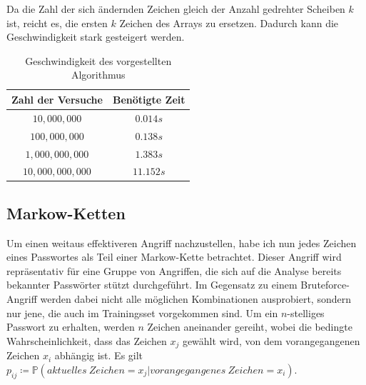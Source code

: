 \documentclass[12pt,a4paper]{scrartcl}
\numberwithin{equation}{section}
\numberwithin{myalgctr}{section}
\numberwithin{mytheoremctr}{section}
\begin{document}
\noindent
 Da die Zahl der sich ändernden Zeichen gleich der Anzahl gedrehter Scheiben $k$ ist, reicht es, die ersten $k$ Zeichen des Arrays zu ersetzen. Dadurch kann die Geschwindigkeit stark gesteigert werden.
\begin{table}[h!]
	\centering
	\begin{tabular}{|c|c|}
		\hline
		\rowcolor[HTML]{C0C0C0} 
		Zahl der Versuche & Benötigte Zeit \\ \hline
		\rowcolor[HTML]{EFEFEF} 
		$10,000,000$      & $0.014s$                   \\ \hline
		\rowcolor[HTML]{EFEFEF} 
		$100,000,000$     & $0.138s$                   \\ \hline
		\rowcolor[HTML]{EFEFEF} 
		$1,000,000,000$   & $1.383s$                   \\ \hline
		\rowcolor[HTML]{EFEFEF} 
		$10,000,000,000$  & $11.152s$                  \\ \hline
	\end{tabular}
	\caption{Geschwindigkeit des vorgestellten Algorithmus}
	\label{bruteforceTime}
\end{table}

	\newpage
	\subsection{Markow-Ketten}\label{markov-ketten}
	Um einen weitaus effektiveren Angriff nachzustellen, habe ich nun jedes Zeichen eines Passwortes als Teil einer Markow-Kette betrachtet. Dieser Angriff wird repräsentativ für eine Gruppe von Angriffen, die sich auf die Analyse bereits bekannter Passwörter stützt durchgeführt. Im Gegensatz zu einem Bruteforce-Angriff werden dabei nicht alle möglichen Kombinationen ausprobiert, sondern nur jene, die auch im Trainingsset vorgekommen sind. Um ein $n$-stelliges Passwort zu erhalten, werden $n$ Zeichen aneinander gereiht, wobei die bedingte Wahrscheinlichkeit, dass das Zeichen $x_j$ gewählt wird, von dem vorangegangenen Zeichen $x_i$ abhängig ist. Es gilt $p_{ij}\coloneqq \mathbb{P}(aktuelles~Zeichen = x_j| vorangegangenes~Zeichen = x_i)$.
	
\end{document}
